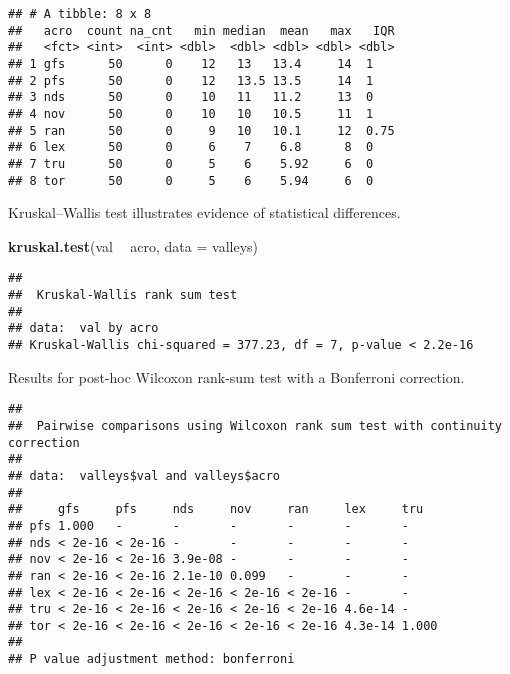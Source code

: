 \documentclass[]{book}
\newenvironment{Shaded}{\begin{snugshade}}{\end{snugshade}}
\newcommand{\DataTypeTok}[1]{\textcolor[rgb]{0.13,0.29,0.53}{#1}}
\newcommand{\KeywordTok}[1]{\textcolor[rgb]{0.13,0.29,0.53}{\textbf{#1}}}
\newcommand{\NormalTok}[1]{#1}
\newcommand{\OperatorTok}[1]{\textcolor[rgb]{0.81,0.36,0.00}{\textbf{#1}}}
\newcommand{\OtherTok}[1]{\textcolor[rgb]{0.56,0.35,0.01}{#1}}
\newcommand{\StringTok}[1]{\textcolor[rgb]{0.31,0.60,0.02}{#1}}
\begin{document}
\begin{verbatim}
## # A tibble: 8 x 8
##   acro  count na_cnt   min median  mean   max   IQR
##   <fct> <int>  <int> <dbl>  <dbl> <dbl> <dbl> <dbl>
## 1 gfs      50      0    12   13   13.4     14  1   
## 2 pfs      50      0    12   13.5 13.5     14  1   
## 3 nds      50      0    10   11   11.2     13  0   
## 4 nov      50      0    10   10   10.5     11  1   
## 5 ran      50      0     9   10   10.1     12  0.75
## 6 lex      50      0     6    7    6.8      8  0   
## 7 tru      50      0     5    6    5.92     6  0   
## 8 tor      50      0     5    6    5.94     6  0
\end{verbatim}

Kruskal--Wallis test illustrates evidence of statistical differences.

\begin{Shaded}
\begin{Highlighting}[]
\KeywordTok{kruskal.test}\NormalTok{(val }\OperatorTok{~}\StringTok{ }\NormalTok{acro, }\DataTypeTok{data =}\NormalTok{ valleys)}
\end{Highlighting}
\end{Shaded}

\begin{verbatim}
## 
##  Kruskal-Wallis rank sum test
## 
## data:  val by acro
## Kruskal-Wallis chi-squared = 377.23, df = 7, p-value < 2.2e-16
\end{verbatim}

Results for post-hoc Wilcoxon rank-sum test with a Bonferroni correction.

\begin{Shaded}
\end{Shaded}

\begin{verbatim}
## 
##  Pairwise comparisons using Wilcoxon rank sum test with continuity correction 
## 
## data:  valleys$val and valleys$acro 
## 
##     gfs     pfs     nds     nov     ran     lex     tru  
## pfs 1.000   -       -       -       -       -       -    
## nds < 2e-16 < 2e-16 -       -       -       -       -    
## nov < 2e-16 < 2e-16 3.9e-08 -       -       -       -    
## ran < 2e-16 < 2e-16 2.1e-10 0.099   -       -       -    
## lex < 2e-16 < 2e-16 < 2e-16 < 2e-16 < 2e-16 -       -    
## tru < 2e-16 < 2e-16 < 2e-16 < 2e-16 < 2e-16 4.6e-14 -    
## tor < 2e-16 < 2e-16 < 2e-16 < 2e-16 < 2e-16 4.3e-14 1.000
## 
## P value adjustment method: bonferroni
\end{verbatim}
\end{document}
